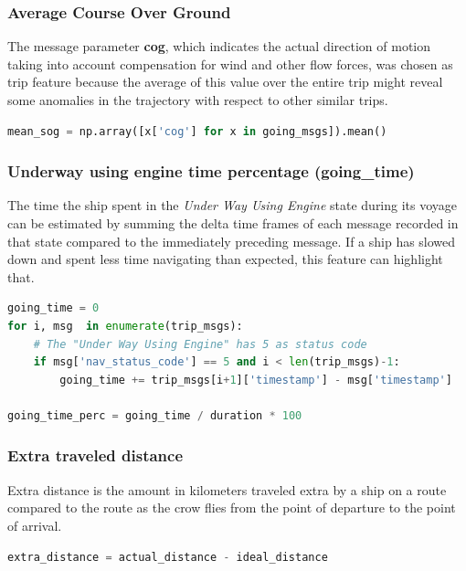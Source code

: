     \subsubsection{Average Course Over Ground}
    
    The message parameter \textbf{cog}, which indicates the actual direction of motion taking into account compensation for wind and other flow forces, was chosen as trip feature because the average of this value over the entire trip might reveal some anomalies in the trajectory with respect to other similar trips.
    
    \begin{lstlisting}[language=Python]
mean_sog = np.array([x['cog'] for x in going_msgs]).mean()
    \end{lstlisting} 
    
    \subsubsection{Underway using engine time percentage (going\_time)}
    The time the ship spent in the \textit{Under Way Using Engine} state during its voyage can be estimated by summing the delta time frames of each message recorded in that state compared to the immediately preceding message. If a ship has slowed down and spent less time navigating than expected, this feature can highlight that.
    
    \begin{lstlisting}[language=Python]
going_time = 0
for i, msg  in enumerate(trip_msgs):
    # The "Under Way Using Engine" has 5 as status code 
    if msg['nav_status_code'] == 5 and i < len(trip_msgs)-1:
        going_time += trip_msgs[i+1]['timestamp'] - msg['timestamp']
        
going_time_perc = going_time / duration * 100
    \end{lstlisting} 

    \subsubsection{Extra traveled distance}
    Extra distance is the amount in kilometers traveled extra by a ship on a route compared to the route as the crow flies from the point of departure to the point of arrival.
    
        \begin{lstlisting}[language=Python]
extra_distance = actual_distance - ideal_distance
    \end{lstlisting}
    

